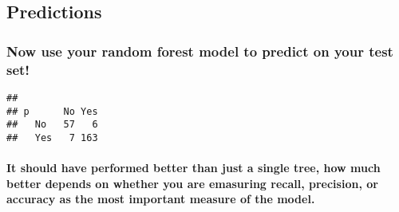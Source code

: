 \documentclass[]{article}
\newenvironment{Shaded}{\begin{snugshade}}{\end{snugshade}}
\newcommand{\KeywordTok}[1]{\textcolor[rgb]{0.13,0.29,0.53}{\textbf{#1}}}
\newcommand{\NormalTok}[1]{#1}
\newcommand{\OperatorTok}[1]{\textcolor[rgb]{0.81,0.36,0.00}{\textbf{#1}}}
\newcommand{\StringTok}[1]{\textcolor[rgb]{0.31,0.60,0.02}{#1}}
\let\oldparagraph\paragraph
\renewcommand{\paragraph}[1]{\oldparagraph{#1}\mbox{}}
\begin{document}
\hypertarget{predictions}{%
\subsection{Predictions}\label{predictions}}

\hypertarget{now-use-your-random-forest-model-to-predict-on-your-test-set}{%
\subsubsection{Now use your random forest model to predict on your test
set!}\label{now-use-your-random-forest-model-to-predict-on-your-test-set}}

\begin{Shaded}
\end{Shaded}

\begin{verbatim}
##      
## p      No Yes
##   No   57   6
##   Yes   7 163
\end{verbatim}

\hypertarget{it-should-have-performed-better-than-just-a-single-tree-how-much-better-depends-on-whether-you-are-emasuring-recall-precision-or-accuracy-as-the-most-important-measure-of-the-model.}{%
\paragraph{It should have performed better than just a single tree, how
much better depends on whether you are emasuring recall, precision, or
accuracy as the most important measure of the
model.}\label{it-should-have-performed-better-than-just-a-single-tree-how-much-better-depends-on-whether-you-are-emasuring-recall-precision-or-accuracy-as-the-most-important-measure-of-the-model.}}
\end{document}
